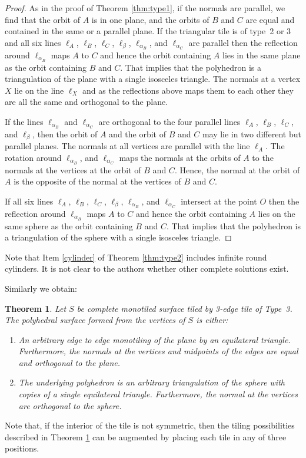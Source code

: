 \documentclass[11pt]{amsart}
\newtheorem{theorem}{Theorem}
\theoremstyle{remark}
\begin{document}
\begin{proof}
As in the proof of Theorem  \ref{thm:type1}, if the normals are parallel,
we find that the orbit of $A$ is in one plane, and the orbits of $B$ and $C$ are equal and contained in the
same or a parallel plane.
  If the triangular tile is of type~2 or 3 and all six lines $\ell_A$,
  $\ell_B$, $\ell_C$, $\ell_{\beta}$, $\ell_{\alpha_B}$, and
  $\ell_{\alpha_C}$ are parallel then the reflection around
  $\ell_{\alpha_B}$ maps $A$ to $C$ and hence the orbit containing $A$
  lies in the same plane as the orbit containing $B$ and $C$. That
  implies that the polyhedron is a triangulation of the plane with a
  single isosceles triangle. The normals at a vertex $X$ lie on the
  line $\ell_X$ and as the reflections above maps them to each other
  they are all the same and orthogonal to the plane. 

If  the lines $\ell_{\alpha_B}$
  and $\ell_{\alpha_C}$ are orthogonal to the four parallel lines
  $\ell_A$, $\ell_B$, $\ell_C$, and $\ell_{\beta}$, then the orbit of
  $A$ and the orbit of $B$ and $C$ may lie in two different but
  parallel planes. The normals at all vertices are parallel with the
  line $\ell_A$. The rotation around $\ell_{\alpha_B}$, and
  $\ell_{\alpha_C}$ maps the normals at the orbits of $A$ to the
  normals at the vertices at the orbit of $B$ and $C$. Hence, the
  normal at the orbit of $A$ is the opposite of the normal at the
  vertices of $B$ and $C$.  
  
  
  If  all six lines $\ell_A$,
  $\ell_B$, $\ell_C$, $\ell_{\beta}$, $\ell_{\alpha_B}$, and
  $\ell_{\alpha_C}$ intersect at the point $O$ then the reflection
  around $\ell_{\alpha_B}$ maps $A$ to $C$ and hence the orbit
  containing $A$ lies on the same sphere as the orbit containing $B$
  and $C$. That implies that the polyhedron is a triangulation of the
  sphere with a single isosceles triangle. 
\end{proof}
Note that Item \ref{cylinder} of Theorem \ref{thm:type2} includes infinite round cylinders. It is not clear to the authors whether other complete solutions exist.



Similarly we obtain:
\begin{theorem}  \label{thm:type3}
  Let $S$ be complete monotiled surface tiled by 3-edge tile of
  Type~3.  The polyhedral surface formed from the vertices of $S$ is either:
  \begin{enumerate}
  \item An arbitrary edge to edge monotiling of the plane by an equilateral triangle. 
  Furthermore, the normals at the vertices and midpoints of the edges are equal and
    orthogonal to the plane.
      \item The underlying polyhedron is an arbitrary triangulation of the
    sphere with copies of a single equilateral triangle. Furthermore,
    the normal at the vertices are orthogonal to the sphere.
  \end{enumerate}
  \end{theorem}
Note that, if the interior of the tile is not symmetric, then the tiling possibilities described in Theorem \ref{thm:type3}
can be augmented by placing each tile in any of three positions.
\end{document}

